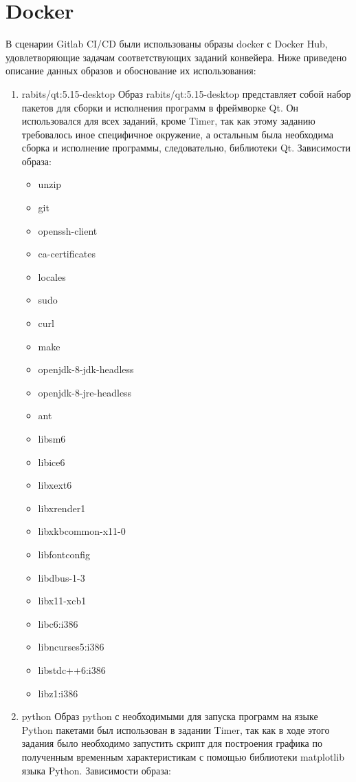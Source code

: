 \documentclass[a4paper,14pt]{extreport}
\begin{document}
\section{Docker}
В сценарии Gitlab CI/CD были использованы образы docker с Docker Hub, 
удовлетворяющие задачам соответствующих заданий конвейера. Ниже 
приведено описание данных образов и обоснование их использования:
\begin{enumerate} 
\item rabits/qt:5.15-desktop
Образ rabits/qt:5.15-desktop представляет собой набор пакетов для 
сборки и исполнения программ в фреймворке Qt. Он использовался 
для всех заданий, кроме Timer, так как этому 
заданию требовалось иное специфичное окружение, а остальным 
была необходима сборка и исполнение программы, следовательно, 
библиотеки Qt. Зависимости образа:
\begin{itemize}
\item unzip
\item git
\item openssh-client
\item ca-certificates
\item locales
\item sudo
\item curl
\item make
\item openjdk-8-jdk-headless
\item openjdk-8-jre-headless
\item ant
\item libsm6
\item libice6
\item libxext6
\item libxrender1
\item libxkbcommon-x11-0
\item libfontconfig
\item libdbus-1-3
\item libx11-xcb1
\item libc6:i386
\item libncurses5:i386
\item libstdc++6:i386
\item libz1:i386
\end{itemize}
\item python
Образ python с необходимыми для запуска программ на языке Python
пакетами был использован в задании Timer, так как в ходе этого 
задания было необходимо запустить скрипт для построения графика 
по полученным временным характеристикам с помощью библиотеки 
matplotlib языка Python. Зависимости образа:

\end{enumerate}
\end{document}
